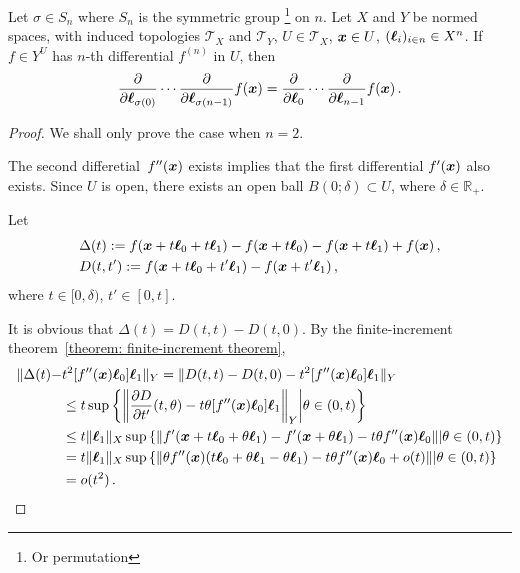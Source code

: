 \documentclass[openany]{book}
\begin{document}
\begin{theorem}
	\label{theorem: symmetry of higher-order differentiation}
	Let $\sigma \in S_n$ where $S_n$ is the symmetric group%
		\footnote{Or permutation}
	on $n$.
	Let $X$ and $Y$ be normed spaces, with induced topologies $\mathscr T_X$ and $\mathscr T_Y$, $U \in \mathscr T_X$, $\boldsymbol{x} \in U$, $(\boldsymbol{\ell}_i)_{i \in n} \in X^n$.
	If $f \in Y^U$ has $n$-th differential $f^{(n)}$ in $U$, then
	\begin{equation*}
		\pdiff{}{\bv \ell_{\sigma(0)}} \cdots \pdiff{}{\bv \ell_{\sigma(n-1)}} f(\bv x)
			= \pdiff{}{\bv \ell_0} \cdots \pdiff{}{\bv \ell_{n-1}} f(\bv x)\,.
	\end{equation*}
\end{theorem}
\begin{proof}
	We shall only prove the case when $n = 2$.

	The second differetial~$f''(\boldsymbol{x})$ exists implies that the first differential $f'(\boldsymbol{x})$ also exists. 
	Since $U$ is open, there exists an open ball $B(0; \delta) \subset U$, where $\delta \in \mathbb R_+$.

	Let
	\begin{align*}
		&\Delta(t) := f(\boldsymbol{x} + t \boldsymbol{\ell}_0 + t \boldsymbol{\ell}_1) 
			- f(\boldsymbol{x} + t \boldsymbol{\ell}_0) - f(\boldsymbol{x} + t \boldsymbol{\ell}_1) + f(\boldsymbol{x})\,,
		\\
		&D(t, t') := f(\boldsymbol{x} + t \boldsymbol{\ell}_0 + t' \boldsymbol{\ell}_1)
			- f(\boldsymbol{x} + t' \boldsymbol{\ell}_1)\,,
	\end{align*}
	where $t \in [0, \delta)$, $t' \in [0, t]$. 

	It is obvious that $\Delta(t) = D(t, t) - D(t, 0)$. 
	By the finite-increment theorem~\ref{theorem: finite-increment theorem}, 
	\begin{align*}
		\|\Delta(t) - &t^2 [f''(\bv x) \bv \ell_0] \bv \ell_1\|_Y
			= \|D(t, t) - D(t, 0) - t^2 [f''(\bv x) \bv \ell_0] \bv \ell_1\|_Y
		\\
			&\leq t \sup \left\{
				\left\|
					\pdiff{D}{t'}(t, \theta) - t \theta [f''(\bv x) \bv \ell_0] \bv \ell_1
				\right\|_Y
			\middle|
				\theta \in (0, t)
			\right\}
		\\
			&\leq t \|\bv \ell_1\|_X \sup \left\{
				\left\|
					f'(\bv x + t \bv \ell_0 + \theta \bv \ell_1)
						- f'(\bv x + \theta \bv \ell_1) 
						- t \theta f''(\bv x) \bv \ell_0
				\right\|
			\middle|
				\theta \in (0, t)
			\right\}
		\\
			&= t  \|\bv \ell_1\|_X \sup \left\{
				\left\|
					 	\theta f''(\bv x) (t\bv \ell_0 + \theta \bv \ell_1 - \theta \bv \ell_1)
						- t \theta f''(\bv x) \bv \ell_0
						+ o(t)
				\right\|
			\middle|
				\theta \in (0, t)
			\right\}
		\\
			&= o(t^2)\,.
	\end{align*} 


\end{proof}
\end{document}
